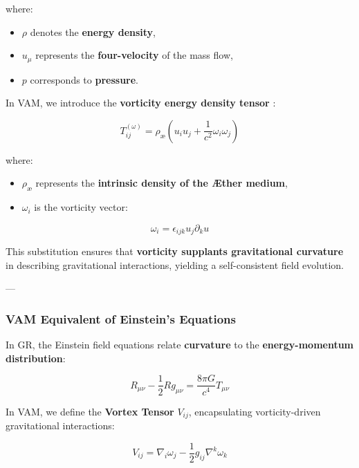 where:
\begin{itemize}
    \item $\rho$ denotes the \textbf{energy density},
    \item $u_\mu$ represents the \textbf{four-velocity} of the mass flow,
    \item $p$ corresponds to \textbf{pressure}.
\end{itemize}

In VAM, we introduce the \textbf{vorticity energy density tensor} \cite{thomson_vortex}:



\begin{equation*}
    T^{(\omega)}_{ij} = \rho_\text{\ae} \left( u_i u_j + \frac{1}{c^2} \omega_i \omega_j \right)
\end{equation*}


where:
\begin{itemize}
    \item $\rho_\text{\ae}$ represents the \textbf{intrinsic density of the Æther medium},
    \item $\omega_i$ is the vorticity vector:
\end{itemize}


\begin{equation*}
    \omega_i = \epsilon_{ijk} u_j \partial_k u
\end{equation*}

This substitution ensures that \textbf{vorticity supplants gravitational curvature} in describing gravitational interactions, yielding a self-consistent field evolution.



---

\subsubsection*{VAM Equivalent of Einstein’s Equations}
In GR, the Einstein field equations relate \textbf{curvature} to the \textbf{energy-momentum distribution}:

\begin{equation*}
    R_{\mu\nu} - \frac{1}{2} R g_{\mu\nu} = \frac{8\pi G}{c^4} T_{\mu\nu}
\end{equation*}


In VAM, we define the \textbf{Vortex Tensor} $V_{ij}$, encapsulating vorticity-driven gravitational interactions:

\begin{equation*}
    V_{ij} = \nabla_i \omega_j - \frac{1}{2} g_{ij} \nabla^k \omega_k
\end{equation*}




